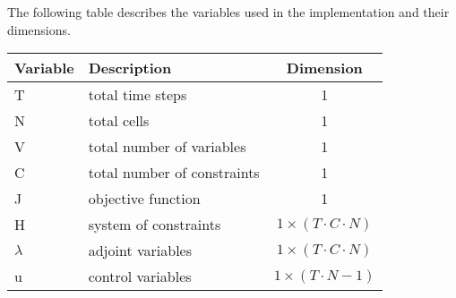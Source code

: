 
The following table describes the variables used in the implementation and their dimensions. \\
\begin{tabular}{ | l | l | c |}
  \hline                        
	Variable & Description & Dimension \\
  \hline                        
	T & total time steps & 1 \\ 		
  \hline  
  	N & total cells & 1 \\
  \hline  
	V & total number of variables & 1 \\
  \hline  
	C & total number of constraints & 1\\		
  \hline  
	J & objective function & 1 \\
  \hline  
	H & system of constraints & $1 \times(T \cdot C \cdot N)$ \\
  \hline  
	$\lambda$ & adjoint variables & $1 \times (T \cdot C \cdot N)$ \\
  \hline  
	u & control variables & $1 \times (T \cdot N-1)$ \\  
  \hline  
  	
\end{tabular}


